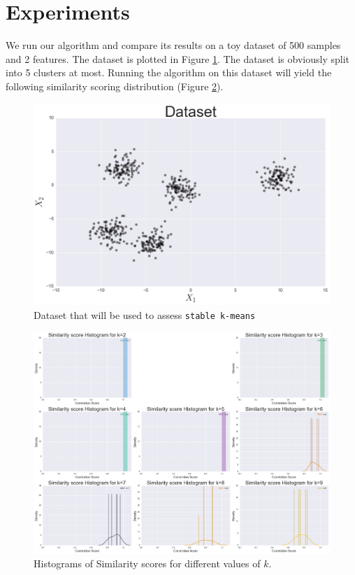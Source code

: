 \documentclass[10pt,twocolumn,letterpaper]{article}
\begin{document}
\section{Experiments} \label{implementation}

We run our algorithm and compare its results on a toy dataset
of 500 samples and 2 features. The dataset is plotted in Figure \ref{fig:Dataset-that-will}. The dataset is obviously split into 5 clusters at most. Running the
algorithm on this dataset will yield the following similarity scoring
distribution (Figure \ref{fig:Histograms-of-Similarity}).

\begin{figure}[htbp] 
\begin{center}
\includegraphics[scale=0.25]{figure/dataset.png}
\end{center}
\caption{\label{fig:Dataset-that-will}Dataset that will be used to assess
\texttt{stable k-means}}
\end{figure}


\begin{figure}[htbp] 
\begin{center}
\includegraphics[scale=0.35]{figure/histogram.png}
\end{center}
\caption{\label{fig:Histograms-of-Similarity}Histograms of Similarity scores
for different values of $k$.}
\end{figure}
\end{document}
